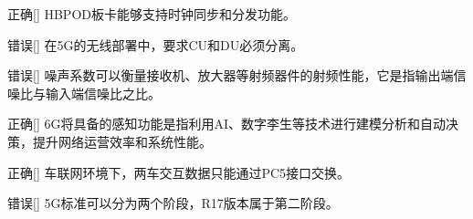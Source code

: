 \begin{choice}{\;正确\;}[]
    HBPOD板卡能够支持时钟同步和分发功能。

\end{choice}

\begin{choice}{\;错误\;}[]
    在5G的无线部署中，要求CU和DU必须分离。

\end{choice}

\begin{choice}{\;错误\;}[]
    噪声系数可以衡量接收机、放大器等射频器件的射频性能，它是指输出端信噪比与输入端信噪比之比。

\end{choice}

\begin{choice}{\;正确\;}[]
    6G将具备的感知功能是指利用AI、数字李生等技术进行建模分析和自动决策，提升网络运营效率和系统性能。

\end{choice}

\begin{choice}{\;正确\;}[]
    车联网环境下，两车交互数据只能通过PC5接口交换。

\end{choice}

\begin{choice}{\;错误\;}[]
    5G标准可以分为两个阶段，R17版本属于第二阶段。

\end{choice}







